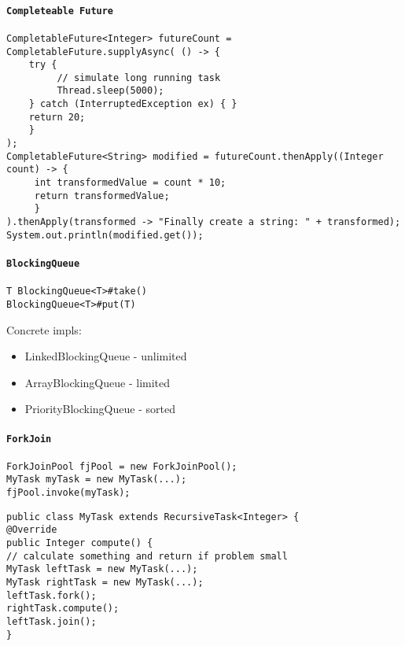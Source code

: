 \paragraph{\texttt{Completeable Future}}
\begin{verbatim}
CompletableFuture<Integer> futureCount = CompletableFuture.supplyAsync( () -> {
    try {
         // simulate long running task 
         Thread.sleep(5000);
    } catch (InterruptedException ex) { }
    return 20; 
    }
);
CompletableFuture<String> modified = futureCount.thenApply((Integer count) -> {
     int transformedValue = count * 10;
     return transformedValue; 
     }
).thenApply(transformed -> "Finally create a string: " + transformed);
System.out.println(modified.get());
\end{verbatim}


\paragraph{\texttt{BlockingQueue}}
\begin{verbatim}
T BlockingQueue<T>#take()
BlockingQueue<T>#put(T)
\end{verbatim}
Concrete impls:
\begin{itemize}
	\item LinkedBlockingQueue - unlimited
	\item ArrayBlockingQueue - limited
	\item PriorityBlockingQueue - sorted
\end{itemize}

\paragraph{\texttt{ForkJoin}}
\begin{verbatim}
ForkJoinPool fjPool = new ForkJoinPool();
MyTask myTask = new MyTask(...);
fjPool.invoke(myTask);
\end{verbatim}
\begin{verbatim}
public class MyTask extends RecursiveTask<Integer> {
@Override
public Integer compute() {
// calculate something and return if problem small
MyTask leftTask = new MyTask(...); 
MyTask rightTask = new MyTask(...);
leftTask.fork();
rightTask.compute();
leftTask.join();
}
\end{verbatim}
